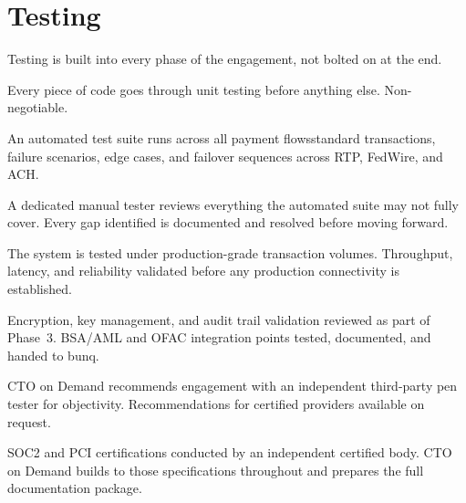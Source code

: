 
\section{Testing}

Testing is built into every phase of the engagement, not bolted on at the end.

\begin{description}[style=nextline, leftmargin=0pt, itemsep=4pt]
\item[\textsf{Unit Testing}] Every piece of code goes through unit testing before anything else. Non-negotiable.
\item[\textsf{Automated Testing}] An automated test suite runs across all payment flows\dash standard transactions, failure scenarios, edge cases, and failover sequences across RTP, FedWire, and ACH.
\item[\textsf{Manual Testing}] A dedicated manual tester reviews everything the automated suite may not fully cover. Every gap identified is documented and resolved before moving forward.
\item[\textsf{Performance \& Load Testing}] The system is tested under production-grade transaction volumes. Throughput, latency, and reliability validated before any production connectivity is established.
\item[\textsf{Security Review}] Encryption, key management, and audit trail validation reviewed as part of Phase~3. BSA/AML and OFAC integration points tested, documented, and handed to bunq.
\needspace{6cm}
\item[\textsf{Penetration Testing}] CTO on Demand recommends engagement with an independent third-party pen tester for objectivity. Recommendations for certified providers available on request.
\item[\textsf{Certifications}] SOC2 and PCI certifications conducted by an independent certified body. CTO on Demand builds to those specifications throughout and prepares the full documentation package.
\end{description}
